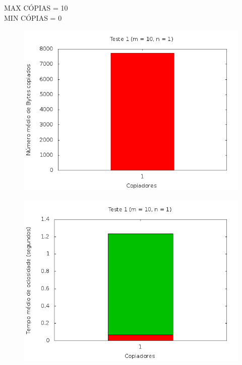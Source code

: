 \documentclass[12pt,a4paper]{article}
\begin{document}
MAX CÓPIAS = 10
\\
MIN CÓPIAS = 0

\begin{center}
\begin{figure}[H]
    \center
    \includegraphics[scale=0.5]{imagens/grafico_bytes1.png}
    \label{teste1_bytes}
\end{figure}
\end{center}

\begin{center}
\begin{figure}[H]
    \center
    \includegraphics[scale=0.5]{imagens/grafico_ociosidade1.png}
    \label{teste1_ociosidade}
\end{figure}
\end{center}
\end{document}

